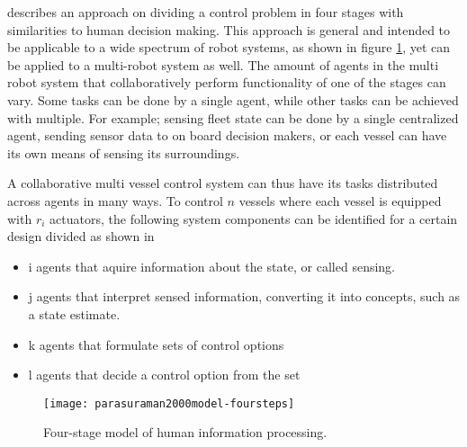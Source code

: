 \citet{parasuraman2000model} describes an approach on dividing a control problem in four stages with similarities to human decision making. This approach is general and intended to be applicable to a wide spectrum of robot systems, as shown in figure \ref{fig:parasuraman2000model-foursteps}, yet can be applied to a multi-robot system as well. The amount of agents in the multi robot system that collaboratively perform functionality of one of the stages can vary. Some tasks can be done by a single agent, while other tasks can be achieved with multiple. For example; sensing fleet state can be done by a single centralized agent, sending sensor data to on board decision makers, or each vessel can have its own means of sensing its surroundings. 

A collaborative multi vessel control system can thus have its tasks distributed across agents in many ways. To control $n$ vessels where each vessel is equipped with $r_i$ actuators, the following system components can be identified for a certain design divided as shown in \citet{parasuraman2000model}
\begin{itemize}
	\item i agents that aquire information about the state, or called sensing.
	\item j agents that interpret sensed information, converting it into concepts, such as a state estimate. 
	\item k agents that formulate sets of control options
	\item l agents that decide a control option from the set
\end{itemize}

\begin{figure}[H]
	\centering
	\texttt{[image: parasuraman2000model-foursteps]}
	\caption{Four-stage model of human information processing. \cite{parasuraman2000model}}
	\label{fig:parasuraman2000model-foursteps}
\end{figure}

